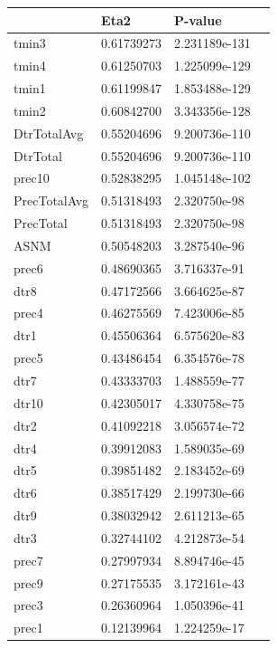 \newpage
\begin{table}[H]
	\centering
	\label{ClusterVarImp2}
	\begin{tabular}{llll}
		& Eta2       & P-value       \\
		\hline
		tmin3          & 0.61739273 & 2.231189e-131 \\
		tmin4          & 0.61250703 & 1.225099e-129 \\
		tmin1          & 0.61199847 & 1.853488e-129 \\
		tmin2          & 0.60842700 & 3.343356e-128 \\
		DtrTotalAvg    & 0.55204696 & 9.200736e-110 \\
		DtrTotal       & 0.55204696 & 9.200736e-110 \\
		prec10         & 0.52838295 & 1.045148e-102 \\
		PrecTotalAvg   & 0.51318493 & 2.320750e-98  \\
		PrecTotal      & 0.51318493 & 2.320750e-98  \\
		ASNM           & 0.50548203 & 3.287540e-96  \\
		prec6          & 0.48690365 & 3.716337e-91  \\
		dtr8           & 0.47172566 & 3.664625e-87  \\
		prec4          & 0.46275569 & 7.423006e-85  \\
		dtr1           & 0.45506364 & 6.575620e-83  \\
		prec5          & 0.43486454 & 6.354576e-78  \\
		dtr7           & 0.43333703 & 1.488559e-77  \\
		dtr10          & 0.42305017 & 4.330758e-75  \\
		dtr2           & 0.41092218 & 3.056574e-72  \\
		dtr4           & 0.39912083 & 1.589035e-69  \\
		dtr5           & 0.39851482 & 2.183452e-69  \\
		dtr6           & 0.38517429 & 2.199730e-66  \\
		dtr9           & 0.38032942 & 2.611213e-65  \\
		dtr3           & 0.32744102 & 4.212873e-54  \\
		prec7          & 0.27997934 & 8.894746e-45  \\
		prec9          & 0.27175535 & 3.172161e-43  \\
		prec3          & 0.26360964 & 1.050396e-41  \\
		prec1          & 0.12139964 & 1.224259e-17  \\

\end{tabular}
\end{table}
